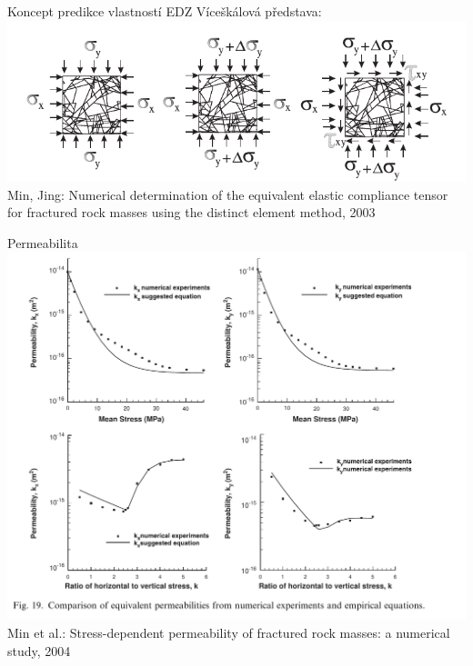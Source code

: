 \documentclass[10pt,xcolor={usenames,dvipsnames}]{beamer} %
\begin{document}
\begin{frame}{Koncept predikce vlastností EDZ}
Víceškálová představa:
\includegraphics[width=\textwidth]{graphics/2D_fractures_loading.png}
\vspace{2ex}
Min, Jing: Numerical determination of the equivalent elastic compliance tensor
for fractured rock masses using the distinct element method, 2003
\end{frame}

\begin{frame}{Permeabilita}
\includegraphics[width=\textwidth]{graphics/2D_equiv_permeabilty.png}
\vspace{2ex}
Min et al.: Stress-dependent permeability of fractured rock
masses: a numerical study, 2004
\end{frame}

% 
\end{document}
